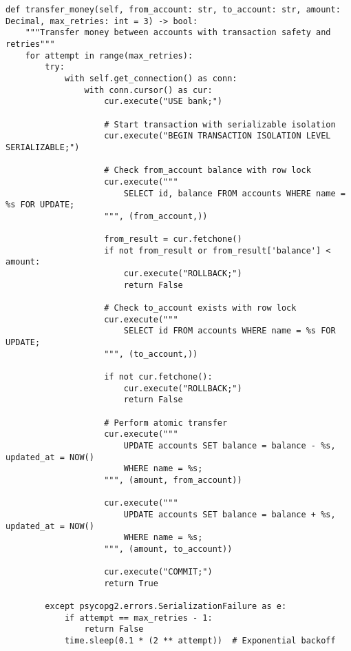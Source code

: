 \begin{verbatim}
def transfer_money(self, from_account: str, to_account: str, amount: Decimal, max_retries: int = 3) -> bool:
    """Transfer money between accounts with transaction safety and retries"""
    for attempt in range(max_retries):
        try:
            with self.get_connection() as conn:
                with conn.cursor() as cur:
                    cur.execute("USE bank;")

                    # Start transaction with serializable isolation
                    cur.execute("BEGIN TRANSACTION ISOLATION LEVEL SERIALIZABLE;")

                    # Check from_account balance with row lock
                    cur.execute("""
                        SELECT id, balance FROM accounts WHERE name = %s FOR UPDATE;
                    """, (from_account,))

                    from_result = cur.fetchone()
                    if not from_result or from_result['balance'] < amount:
                        cur.execute("ROLLBACK;")
                        return False

                    # Check to_account exists with row lock
                    cur.execute("""
                        SELECT id FROM accounts WHERE name = %s FOR UPDATE;
                    """, (to_account,))

                    if not cur.fetchone():
                        cur.execute("ROLLBACK;")
                        return False

                    # Perform atomic transfer
                    cur.execute("""
                        UPDATE accounts SET balance = balance - %s, updated_at = NOW()
                        WHERE name = %s;
                    """, (amount, from_account))

                    cur.execute("""
                        UPDATE accounts SET balance = balance + %s, updated_at = NOW()
                        WHERE name = %s;
                    """, (amount, to_account))

                    cur.execute("COMMIT;")
                    return True

        except psycopg2.errors.SerializationFailure as e:
            if attempt == max_retries - 1:
                return False
            time.sleep(0.1 * (2 ** attempt))  # Exponential backoff
\end{verbatim}


